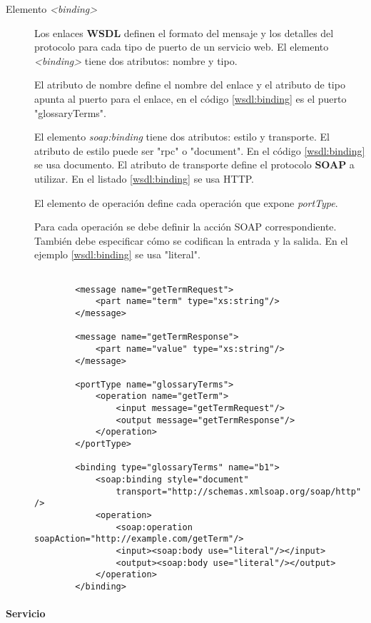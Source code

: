 \begin{description}
 	
 	
 	\item [Elemento \textit{<binding>}]
 	Los enlaces \textbf{WSDL} definen el formato del mensaje y los detalles del protocolo para cada tipo de puerto de un servicio web.  	El elemento \textit{<binding>} tiene dos atributos: nombre y tipo.
 	
 	El atributo de nombre define el nombre del enlace y el atributo de tipo apunta al puerto para el enlace, en el  c\'odigo \ref{wsdl:binding} es el puerto "glossaryTerms".
 	
 	El elemento\textit{ soap:binding} tiene dos atributos: estilo y transporte.  	
 	El atributo de estilo puede ser "rpc" o "document". En el c\'odigo \ref{wsdl:binding}  se usa documento. El atributo de transporte define el protocolo \textbf{SOAP} a utilizar. En el listado \ref{wsdl:binding} se usa HTTP.
 	
 	El elemento de operación define cada operación que expone \textit{portType}.
 	
 	Para cada operación se debe definir la acción SOAP correspondiente. También debe especificar cómo se codifican la entrada y la salida. En el ejemplo \ref{wsdl:binding} se usa "literal".
 		
 		\begin{lstlisting}[label=wsdl:binding, caption= Binding. Tomado de \WC] 
 		
 		<message name="getTermRequest">
 			<part name="term" type="xs:string"/>
 		</message>
 		
 		<message name="getTermResponse">
 			<part name="value" type="xs:string"/>
 		</message>
 		
 		<portType name="glossaryTerms">
 			<operation name="getTerm">
 				<input message="getTermRequest"/>
 				<output message="getTermResponse"/>
 			</operation>
 		</portType>
 		
 		<binding type="glossaryTerms" name="b1">
 			<soap:binding style="document"
 				transport="http://schemas.xmlsoap.org/soap/http" />
 			<operation>
 				<soap:operation soapAction="http://example.com/getTerm"/>
 				<input><soap:body use="literal"/></input>
 				<output><soap:body use="literal"/></output>
 			</operation>
 		</binding> 
 		\end{lstlisting}  
 	
 	\end{description}
 	
 
  
  \paragraph{Servicio}
  
